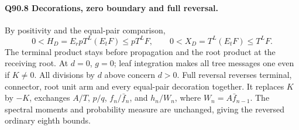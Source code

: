 \paragraph{Q90.8 Decorations, zero boundary and full reversal.}
By positivity and the equal-pair comparison,
\begin{equation}\tag{Q90.8.1}\label{eq:Q90:8.1}
0<H_D=E_rpT^L(E_tF)\le pT^LF,\qquad
0<X_D=T^L(E_tF)\le T^LF.
\end{equation}
The terminal product stays before propagation and the root product
at the receiving root. At \(d=\allowbreak 0\), \(g=\allowbreak 0\); leaf integration makes
all tree messages one even if \(K\ne0\). All divisions by \(d\)
above concern \(d>\allowbreak 0\).
Full reversal reverses terminal, connector, root unit arm and every
equal-pair decoration together. It replaces \(K\) by \(-K\),
exchanges \(A/T\), \(p/q\), \(f_n/\bar f_n\), and \(h_n/W_n\),
where \(W_n=\allowbreak A\bar f_{n-1}\). The spectral moments and probability
measure are unchanged, giving the reversed ordinary eighth bounds.
